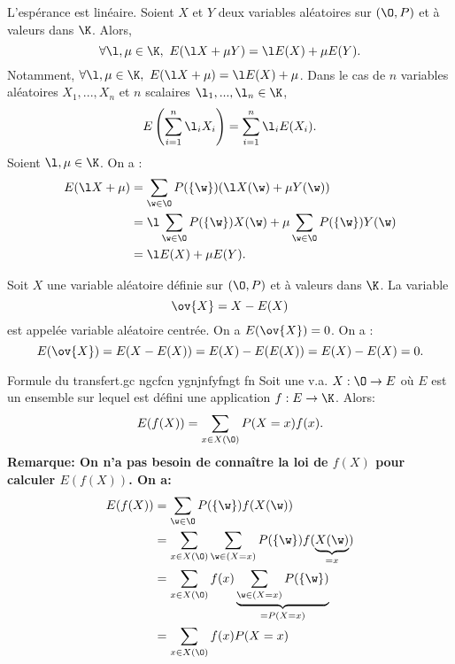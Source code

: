 \documentclass[11pt]{article}
\begin{document}
\begin{thm}{L'espérance est linéaire.}{}
    Soient $X$ et $Y$ deux variables aléatoires sur $(\O, P)$ et à valeurs dans $\K$. Alors,
    \begin{equation*}
        \forall \l, \mu \in \K, ~ E(\l X + \mu Y)=\l E(X) + \mu E(Y).
    \end{equation*}
    Notamment, $\forall \l, \mu \in \K, ~ E(\l X + \mu) = \l E(X) + \mu$.\n
    Dans le cas de $n$ variables aléatoires $X_1,...,X_n$ et $n$ scalaires $\l_1,...,\l_n\in\K$,
    \begin{equation*}
        E\left( \sum_{i=1}^n\l_i X_i \right) = \sum_{i=1}^n\l_i E(X_i).
    \end{equation*} 
    \tcblower
    Soient $\l, \mu\in\K$. On a :
    \begin{align*}
        E(\l X + \mu) &= \sum_{\w\in\O}P(\{\w\})(\l X(\w) + \mu Y(\w))\\
        &= \l\sum_{\w\in\O}P(\{\w\})X(\w)+\mu\sum_{\w\in\O}P(\{\w\})Y(\w)\\
        &= \l E(X) + \mu E(Y).
    \end{align*}
\end{thm}

\begin{prop}{}{}
    Soit $X$ une variable aléatoire définie sur $(\O, P)$ et à valeurs dans $\K$. La variable
    \begin{equation*}
        \ov{X} = X-E(X)
    \end{equation*}
    est appelée variable aléatoire centrée. On a $E(\ov{X})=0$.
    \tcblower
    On a :
    \begin{equation*}
        E(\ov{X})=E(X-E(X))=E(X)-E(E(X))=E(X)-E(X)=0.
    \end{equation*}
\end{prop}

\pagebreak

\begin{thm}{Formule du transfert.gc ngcfcn ygnjnfyfngt fn}{}
    Soit une v.a. $X:\O\to E$ où $E$ est un ensemble sur lequel est défini une application $f:E\to\K$. Alors:
    \begin{equation*}
        E(f(X))=\sum_{x\in X(\O)}P(X=x)f(x).
    \end{equation*}
    \bf{Remarque:} On n'a pas besoin de connaître la loi de $f(X)$ pour calculer $E(f(X))$.
    \tcblower
    On a:
    \begin{align*}
        E(f(X)) &= \sum_{\w\in\O}P(\{\w\})f(X(\w))\\
        &=\sum_{x\in X(\O)}\sum_{\w\in(X=x)}P(\{\w\})f(\underbrace{X(\w)}_{=x})\\
        &=\sum_{x\in X(\O)}f(x)\underbrace{\sum_{\w\in(X=x)}P(\{\w\})}_{=P(X=x)}\\
        &=\sum_{x\in X(\O)}f(x)P(X=x)
    \end{align*}
\end{thm}
\end{document}
